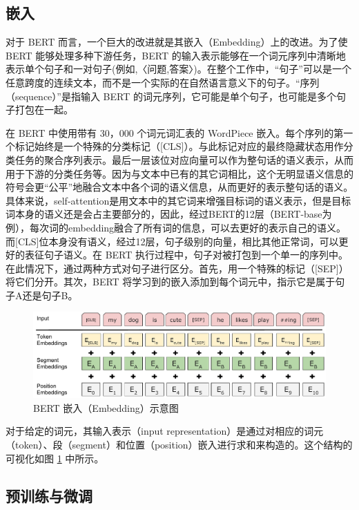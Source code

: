 \subsection{嵌入}

对于 BERT 而言，一个巨大的改进就是其嵌入（Embedding）上的改进。为了使 BERT 能够处理多种下游任务，BERT 的输入表示能够在一个词元序列中清晰地表示单个句子和一对句子(例如,〈问题,答案〉)。在整个工作中，“句子”可以是一个任意跨度的连续文本，而不是一个实际的在自然语言意义下的句子。“序列（sequence）”是指输入 BERT 的词元序列，它可能是单个句子，也可能是多个句子打包在一起。

在 BERT 中使用带有 30，000 个词元词汇表的 WordPiece 嵌入。每个序列的第一个标记始终是一个特殊的分类标记（[CLS]）。与此标记对应的最终隐藏状态用作分类任务的聚合序列表示。最后一层该位对应向量可以作为整句话的语义表示，从而用于下游的分类任务等。因为与文本中已有的其它词相比，这个无明显语义信息的符号会更“公平”地融合文本中各个词的语义信息，从而更好的表示整句话的语义。 具体来说，self-attention是用文本中的其它词来增强目标词的语义表示，但是目标词本身的语义还是会占主要部分的，因此，经过BERT的12层（BERT-base为例），每次词的embedding融合了所有词的信息，可以去更好的表示自己的语义。而[CLS]位本身没有语义，经过12层，句子级别的向量，相比其他正常词，可以更好的表征句子语义。在 BERT 执行过程中，句子对被打包到一个单一的序列中。在此情况下，通过两种方式对句子进行区分。首先，用一个特殊的标记（[SEP]）将它们分开。其次，BERT 将学习到的嵌入添加到每个词元中，指示它是属于句子A还是句子B。

\begin{figure}[htbp]
	\centering
	\includegraphics[width=\linewidth]{figures/bert_Input_Emebeddings.pdf}
	\caption{BERT 嵌入（Embedding）示意图}
	\label{fig:BERT-embedding}
\end{figure}

对于给定的词元，其输入表示（input representation）是通过对相应的词元（token）、段（segment）和位置（position）嵌入进行求和来构造的。这个结构的可视化如图 \ref{fig:BERT-embedding} 中所示。

\subsection{预训练与微调}

